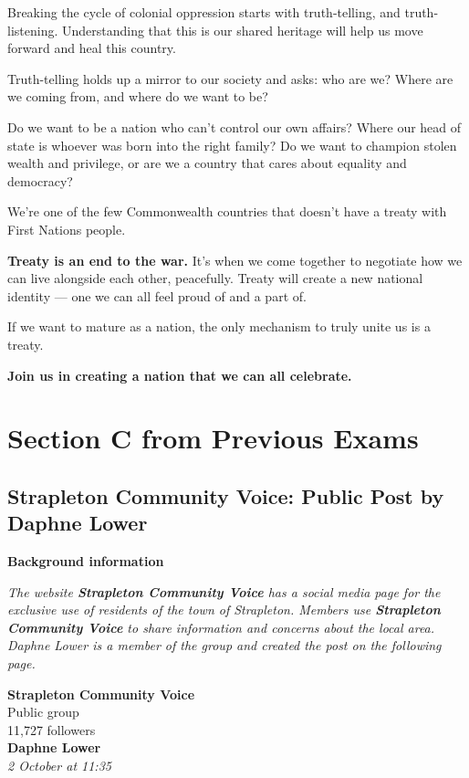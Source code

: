 \documentclass[a4paper]{article}
\begin{document}
Breaking the cycle of colonial oppression starts with truth-telling, and truth-listening. Understanding that this is our shared heritage will help us move forward and heal this country.

Truth-telling holds up a mirror to our society and asks: who are we? Where are we coming from, and where do we want to be?

Do we want to be a nation who can’t control our own affairs? Where our head of state is whoever was born into the right family? Do we want to champion stolen wealth and privilege, or are we a country that cares about equality and democracy?

We’re one of the few Commonwealth countries that doesn’t have a treaty with First Nations people.

\textbf{Treaty is an end to the war.} It’s when we come together to negotiate how we can live alongside each other, peacefully. Treaty will create a new national identity — one we can all feel proud of and a part of.

If we want to mature as a nation, the only mechanism to truly unite us is a treaty.

\textbf{Join us in creating a nation that we can all celebrate.}

\newpage
\section{Section C from Previous Exams}
\subsection{Strapleton Community Voice: Public Post by Daphne Lower}

\textbf{Background information}

\textit{The website \textbf{Strapleton Community Voice} has a social media page for the exclusive use of residents of the town of Strapleton. Members use \textbf{Strapleton Community Voice} to share information and concerns about the local area. Daphne Lower is a member of the group and created the post on the following page.}

\medskip

\textbf{Strapleton Community Voice} \\
Public group \\
11,727 followers\\

\textbf{Daphne Lower} \\
\textit{2 October at 11:35}\\
\end{document}
